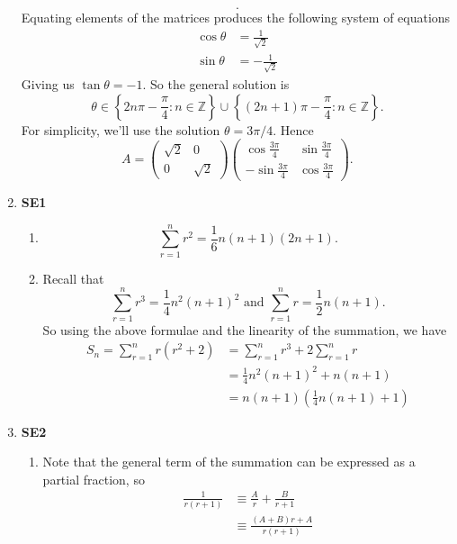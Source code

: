 \documentclass[12pt,oneside]{book}
\begin{document}
\begin{enumerate}
\[        .\] Equating elements of the matrices produces the following system of equations \begin{align*}
            \cos \theta &=  \frac{1}{\sqrt{2}} \\
            \sin \theta &= - \frac{1}{\sqrt{2}}
        \end{align*}
        Giving us $\tan \theta = -1$. So the general solution is \[
            \theta \in \left\{ 2n \pi - \frac{\pi}{4} : n \in \mathbb{Z} \right \} \cup \left\{ (2n+1) \pi - \frac{\pi}{4} : n \in \mathbb{Z} \right \}
        .\] For simplicity, we'll use the solution $\theta = 3\pi / 4$. Hence \[
            A = \begin{pmatrix} \sqrt{2} & 0 \\ 0 & \sqrt{2} \end{pmatrix} \begin{pmatrix} \cos \frac{3\pi}{4} & \sin \frac{3\pi}{4} \\ -\sin \frac{3\pi}{4} & \cos \frac{3\pi}{4} \end{pmatrix}
        .\] 
        \item \textbf{SE1} \begin{enumerate}
            \item \[
                \sum_{r=1}^{n} r^2 = \frac{1}{6} n (n + 1) (2n + 1)
            .\] 
            \item Recall that \[
                \sum_{r=1}^{n} r^3 = \frac{1}{4}n^2(n+1)^2 \text{ and } \sum_{r=1}^{n} r = \frac{1}{2}n(n+1) 
            .\] So using the above formulae and the linearity of the summation, we have \begin{align*}
                S_n = \sum_{r=1}^{n} r(r^2 + 2) &= \sum_{r=1}^{n} r^3 + 2 \sum_{r=1}^{n} r \\
                &= \frac{1}{4}n^2 (n + 1)^2 + n (n+1) \\
                &= n(n+1) \left( \frac{1}{4}n(n+1) + 1 \right)  
            \end{align*}
        \end{enumerate}
        \item \textbf{SE2} \begin{enumerate}
            \item Note that the general term of the summation can be expressed as a partial fraction, so \begin{align*}
                \frac{1}{r(r+1)} &\equiv \frac{A}{r} + \frac{B}{r+1} \\
                &\equiv \frac{(A + B)r + A}{r(r+1)}

\end{align*}
\end{enumerate}
\end{enumerate}
\end{document}
